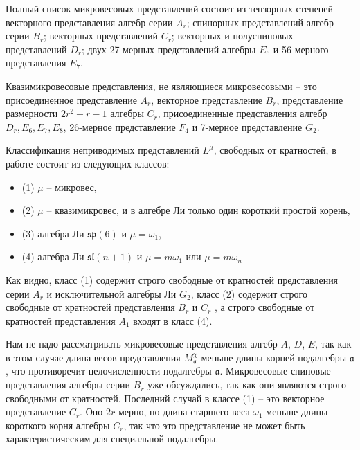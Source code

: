 \documentclass[12pt]{article}
\newcommand{\af}{\mathfrak{a}}
\begin{document}
Полный список микровесовых представлений состоит из тензорных степеней векторного представления
алгебр серии $A_{r}$; спинорных представлений алгебр серии $B_{r}$; векторных представлений $C_{r}$;
векторных и полуспиновых представлений $D_{r}$; двух 
27-мерных представлений алгебры $E_{6}$ и  56-мерного представления $E_{7}$. 

Квазимикровесовые представления, не являющиеся микровесовыми -- это присоединенное представление
$A_{r}$, векторное представление $B_{r}$, представление размерности $2r^{2}-r-1$ алгебры $C_{r}$,
присоединенные представления алгебр $D_{r}, E_{6}, E_{7}, E_{8}$, 26-мерное представление $F_{4}$ и
7-мерное представление $G_{2}$.


Классификация неприводимых представлений  $L^{\mu}$, свободных от кратностей, в работе
\cite{howe1995perspectives,stembridge2003multiplicity} состоит из следующих классов:
\begin{itemize}
\item (1) $\mu$ -- микровес,
\item (2) $\mu$ -- квазимикровес, и в алгебре Ли только один короткий простой корень,
\item (3) алгебра Ли $\mathfrak{sp}(6)$ и $\mu=\omega_{1}$,
\item (4) алгебра Ли $\mathfrak{sl}(n + 1)$ и  $\mu= m\omega_{1}$ или $\mu  = m\omega_{n}$ 
\end{itemize}

Как видно, класс (1) содержит строго свободные от кратностей представления серии  $A_{r}$ и
исключительной алгебры Ли $G_{2}$, класс  (2) содержит строго свободные от кратностей представления
$ B_{r}$ и $C_{r}$ , а строго свободные от кратностей представления $A_{1}$ входят в класс (4).

Нам не надо рассматривать микровесовые представления алгебр $A$, $D$, $E$, так как в этом случае
длина весов представления  $M^{\chi}_{\af}$ меньше длины корней подалгебры  $\af$, что противоречит
целочисленности подалгебры  $\af$. Микровесовые спиновые представления алгебры серии $B_{r}$ уже
обсуждались, так как они являются строго свободными от кратностей. Последний случай в классе (1) --
это векторное представление  $C_{r}$. Оно  $2r$-мерно, но длина старшего веса $\omega_{1}$ меньше
длины короткого корня алгебры $C_{r}$, так что это представление не может быть характеристическим
для специальной подалгебры. 
\end{document}
